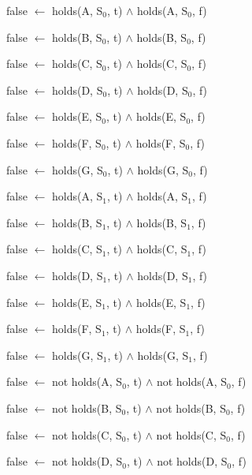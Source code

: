 \documentclass[a4paper]{article}
\begin{document}
        \begin{list}{}{Complementary Rules}
          \item
            false $\leftarrow$ holds(A, S$_{0}$, t) $\land$ holds(A, S$_{0}$, f)
          \item
            false $\leftarrow$ holds(B, S$_{0}$, t) $\land$ holds(B, S$_{0}$, f)
          \item
            false $\leftarrow$ holds(C, S$_{0}$, t) $\land$ holds(C, S$_{0}$, f)
          \item
            false $\leftarrow$ holds(D, S$_{0}$, t) $\land$ holds(D, S$_{0}$, f)
          \item
            false $\leftarrow$ holds(E, S$_{0}$, t) $\land$ holds(E, S$_{0}$, f)
          \item
            false $\leftarrow$ holds(F, S$_{0}$, t) $\land$ holds(F, S$_{0}$, f)
          \item
            false $\leftarrow$ holds(G, S$_{0}$, t) $\land$ holds(G, S$_{0}$, f)
          \item
            false $\leftarrow$ holds(A, S$_{1}$, t) $\land$ holds(A, S$_{1}$, f)
          \item
            false $\leftarrow$ holds(B, S$_{1}$, t) $\land$ holds(B, S$_{1}$, f)
          \item
            false $\leftarrow$ holds(C, S$_{1}$, t) $\land$ holds(C, S$_{1}$, f)
          \item
            false $\leftarrow$ holds(D, S$_{1}$, t) $\land$ holds(D, S$_{1}$, f)
          \item
            false $\leftarrow$ holds(E, S$_{1}$, t) $\land$ holds(E, S$_{1}$, f)
          \item
            false $\leftarrow$ holds(F, S$_{1}$, t) $\land$ holds(F, S$_{1}$, f)
          \item
            false $\leftarrow$ holds(G, S$_{1}$, t) $\land$ holds(G, S$_{1}$, f)
          \item
            false $\leftarrow$ not holds(A, S$_{0}$, t) $\land$ not holds(A, S$_{0}$, f)
          \item
            false $\leftarrow$ not holds(B, S$_{0}$, t) $\land$ not holds(B, S$_{0}$, f)
          \item
            false $\leftarrow$ not holds(C, S$_{0}$, t) $\land$ not holds(C, S$_{0}$, f)
          \item
            false $\leftarrow$ not holds(D, S$_{0}$, t) $\land$ not holds(D, S$_{0}$, f)
          \item

\end{list}
\end{document}
